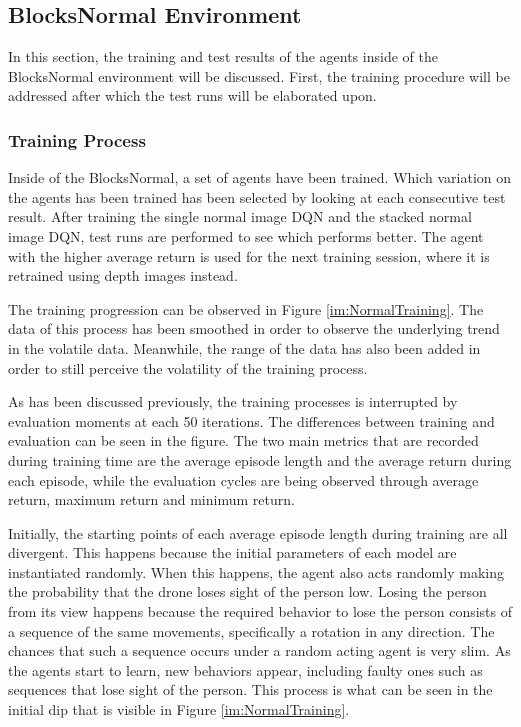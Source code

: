 \subsection{BlocksNormal Environment}
In this section, the training and test results of the agents inside of the 
BlocksNormal environment will be discussed. 
First, the training procedure will be addressed after which the test runs 
will be elaborated upon. 

\subsubsection{Training Process}
Inside of the BlocksNormal, a set of agents have been trained. Which variation on the 
agents has been trained has been selected by looking at each consecutive test result. 
After training the single normal image DQN and the stacked normal image DQN, test 
runs are performed to see which performs better. The agent with the higher 
average return is used for the next training session, where it is retrained using 
depth images instead.

The training progression can be observed in Figure \ref{im:NormalTraining}. The data 
of this process has been smoothed in order to observe the underlying trend in the volatile data. 
Meanwhile, the range of the data has also been added in order to still perceive the 
volatility of the training process. 

As has been discussed previously, the training processes is interrupted by evaluation 
moments at each 50 iterations. The differences between training and 
evaluation can 
be seen in the figure. The two main metrics that are 
recorded during training time are the average episode length and the average return 
during each episode, while the evaluation cycles are being observed through 
average return, maximum return and minimum return. 

Initially, the starting points of each average episode length during training are all divergent. 
This happens because the initial parameters of each model are 
instantiated randomly. When this happens, the agent also acts randomly making the probability 
that the drone loses sight of the person low. Losing the person from its view happens because 
the required behavior to lose the person consists of a sequence of the 
same movements, specifically a rotation in any direction. The chances that such a sequence 
occurs under a random acting agent is very slim. As the agents start to learn, new behaviors 
appear, including faulty ones such as sequences that lose sight of the person. This process
is what can be seen in the initial dip that is visible in Figure \ref{im:NormalTraining}.

